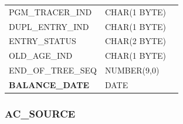 \documentclass[12pt,twoside]{article}
\begin{document}
\begin{longtable}{lll}
 PGM\_TRACER\_IND              &  CHAR(1 BYTE)        &               \\
 DUPL\_ENTRY\_IND              &  CHAR(1 BYTE)        &               \\
 ENTRY\_STATUS                 &  CHAR(2 BYTE)        &               \\
 OLD\_AGE\_IND                 &  CHAR(1 BYTE)        &               \\
 END\_OF\_TREE\_SEQ            &  NUMBER(9,0)         &               \\
 \textbf{BALANCE\_DATE}        &  DATE                &               \\
\hline
\end{longtable}

\normalsize
\subsubsection{AC\_SOURCE}
\label{sec-8-3-7}
\end{document}
